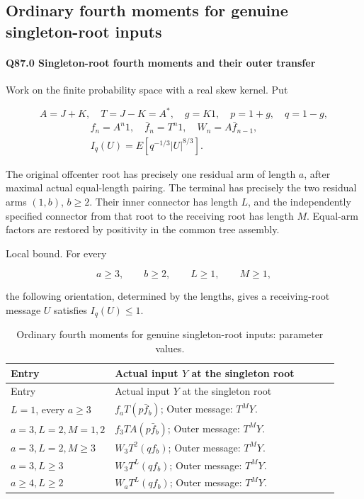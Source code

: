 \subsection{Ordinary fourth moments for genuine singleton-root inputs}\label{proof:Q5-C087}
\paragraph{Q87.0 Singleton-root fourth moments and their outer transfer}\label{part:Q87.0}

Work on the finite probability space with a real skew kernel. Put

\[
 A=J+K,\quad T=J-K=A^*,\quad g=K1,\quad p=1+g,\quad q=1-g,
\]
\[
\begin{gathered}
f_n=A^n1,\quad \bar f_n=T^n1,\quad W_n=A \bar f_{n-1},\qquad\\
I_q(U)=E[q^{-1/3}|U|^{8/3}].
\end{gathered}
\]

The original offcenter root has precisely one residual arm of length
\(a\), after maximal actual equal-length pairing. The terminal has
precisely the two residual arms \((1,\allowbreak  b)\), \(b\ge\allowbreak 2\). Their inner
connector has length \(L\), and the independently specified connector
from that root to the receiving root has length \(M\). Equal-arm factors are restored by positivity in the common tree assembly.

Local bound. For every

\[
 a\ge3,\qquad b\ge2,\qquad L\ge1,\qquad M\ge1,
\]

the following orientation, determined by the lengths, gives a receiving-root message \(U\)
satisfies \(I_q(U)\le\allowbreak 1\).


\begingroup\small
\setlength{\tabcolsep}{3pt}
\setlength{\LTleft}{0pt}\setlength{\LTright}{\fill}
\begin{longtable}{@{}p{0.2200\linewidth}p{0.7000\linewidth}@{}}
\caption{Ordinary fourth moments for genuine singleton-root inputs: parameter values.}\label{tab:parameters:q5-c087:1}\\
\toprule
Entry & Actual input \(Y\) at the singleton root \\
\midrule\endfirsthead
\toprule
Entry & Actual input \(Y\) at the singleton root \\
\midrule\endhead
\bottomrule\endfoot
\(L=\allowbreak 1\), every \(a\ge\allowbreak 3\) & \(f_aT(p\bar f_b)\); Outer message: \(T^M Y\). \\
\addlinespace[2pt]
\(a=\allowbreak 3,\allowbreak  L=\allowbreak 2,\allowbreak  M=\allowbreak 1,\allowbreak  2\) & \(f_3TA(p\bar f_b)\); Outer message: \(T^M Y\). \\
\addlinespace[2pt]
\(a=\allowbreak 3,\allowbreak  L=\allowbreak 2,\allowbreak  M\ge\allowbreak 3\) & \(W_3T^2(qf_b)\); Outer message: \(T^M Y\). \\
\addlinespace[2pt]
\(a=\allowbreak 3,\allowbreak  L\ge\allowbreak 3\) & \(W_3T^L(qf_b)\); Outer message: \(T^M Y\). \\
\addlinespace[2pt]
\(a\ge\allowbreak 4,\allowbreak  L\ge\allowbreak 2\) & \(W_aT^L(qf_b)\); Outer message: \(T^M Y\). \\
\end{longtable}
\endgroup


